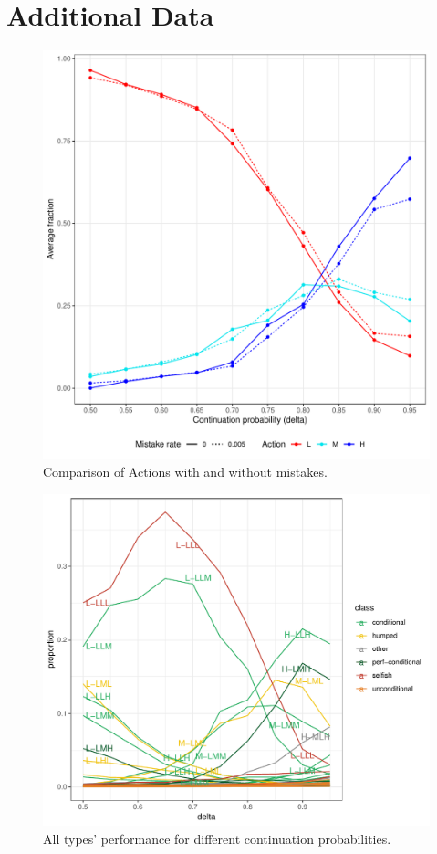 \section{Additional Data}
\label{sec:evo-additional}
\begin{figure}[H]
\begin{center}
    \includegraphics[width=0.8\linewidth]{img/actions_over_delta_with_mistakes.pdf}
    \caption{Comparison of Actions with and without mistakes.}
	\label{fig:mistake-comparision}
\end{center}
\end{figure}


\begin{figure}[H]
\begin{center}
    \includegraphics[width=0.8\linewidth]{img/all_types_t05.pdf}
    \caption{All types' performance for different continuation probabilities.}
	\label{fig:alltypes}
\end{center}
\end{figure}


